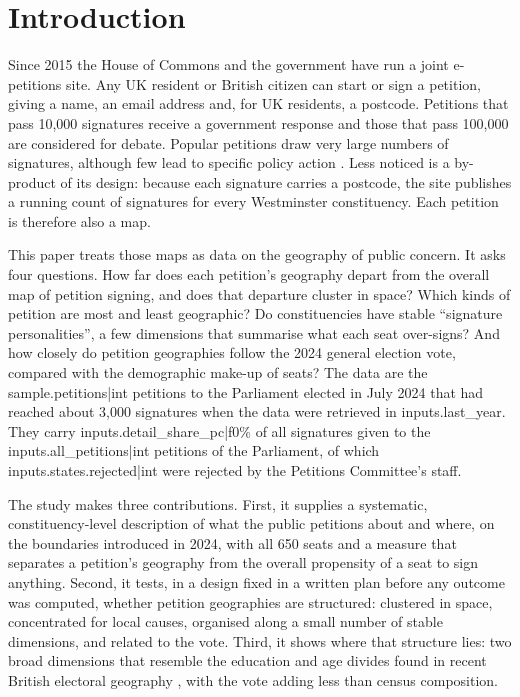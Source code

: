 \documentclass[11pt,a4paper]{article}
\begin{document}
\section{Introduction}\label{sec:intro}
Since 2015 the House of Commons and the government have run a joint e-petitions site. Any UK resident or British citizen can start or sign a petition, giving a name, an email address and, for UK residents, a postcode. Petitions that pass 10,000 signatures receive a government response and those that pass 100,000 are considered for debate. Popular petitions draw very large numbers of signatures, although few lead to specific policy action \citep{lestonbandeira2019,asher2019}. Less noticed is a by-product of its design: because each signature carries a postcode, the site publishes a running count of signatures for every Westminster constituency. Each petition is therefore also a map.

This paper treats those maps as data on the geography of public concern. It asks four questions. How far does each petition's geography depart from the overall map of petition signing, and does that departure cluster in space? Which kinds of petition are most and least geographic? Do constituencies have stable ``signature personalities'', a few dimensions that summarise what each seat over-signs? And how closely do petition geographies follow the 2024 general election vote, compared with the demographic make-up of seats? The data are the {{sample.petitions|int}} petitions to the Parliament elected in July 2024 that had reached about 3,000 signatures when the data were retrieved in {{inputs.last_year}}. They carry {{inputs.detail_share_pc|f0}}\% of all signatures given to the {{inputs.all_petitions|int}} petitions of the Parliament, of which {{inputs.states.rejected|int}} were rejected by the Petitions Committee's staff.

The study makes three contributions. First, it supplies a systematic, constituency-level description of what the public petitions about and where, on the boundaries introduced in 2024, with all 650 seats and a measure that separates a petition's geography from the overall propensity of a seat to sign anything. Second, it tests, in a design fixed in a written plan before any outcome was computed, whether petition geographies are structured: clustered in space, concentrated for local causes, organised along a small number of stable dimensions, and related to the vote. Third, it shows where that structure lies: two broad dimensions that resemble the education and age divides found in recent British electoral geography \citep{jenningsstoker2016,goodwinheath2016}, with the vote adding less than census composition.
\end{document}
